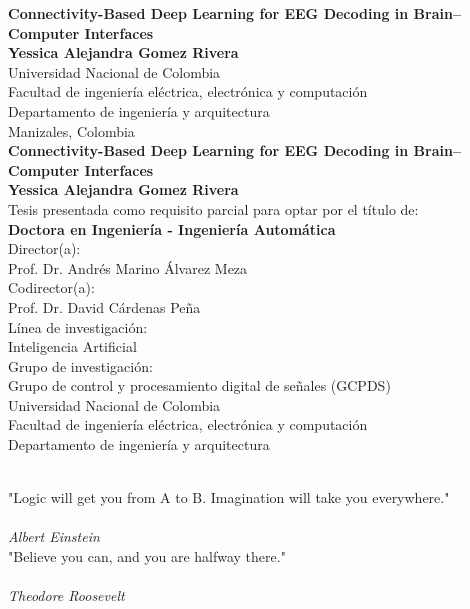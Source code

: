 \documentclass[10pt,english,openany,twoside,letterpaper]{book}
\newcommand{\studentname}{}
\newcommand{\academictitle}{}
\newcommand{\resgroupone}{}
\newcommand{\researchtopic}{}
\newcommand{\thesisname}{}
\newcommand{\director}{}
\newcommand{\codirector}{}
\newcommand{\issuedate}{}
\newcommand{\sede}{}
\newcommand{\department}{}
\newcommand{\faculty}{}
\renewcommand{\studentname}{Yessica Alejandra Gomez Rivera}
\renewcommand{\thesisname}{Connectivity-Based Deep Learning for EEG Decoding in Brain–Computer Interfaces}
\renewcommand{\issuedate}{\the\year}
\renewcommand{\director}{Prof. Dr. Andrés Marino Álvarez Meza}
\renewcommand{\codirector}{Prof. Dr. David Cárdenas Peña }
\renewcommand{\academictitle}{Doctora en Ingeniería - Ingeniería Automática}
\renewcommand{\resgroupone}{Grupo de control y procesamiento digital de señales (GCPDS) }
\renewcommand{\researchtopic}{Inteligencia Artificial}
\renewcommand{\sede}{Manizales}
\renewcommand{\department}{Departamento de ingeniería y arquitectura}
\renewcommand{\faculty}{Facultad de ingeniería eléctrica, electrónica y computación}
\begin{document}
{\newpage
\thispagestyle{empty}
\begin{center}
\begin{figure}
\centering
{}%
\end{figure}
\vspace{2.5cm}
\textbf{\Huge \thesisname} \\ 
\vspace{2.5cm}
\textbf{\Large \studentname} \\
\vspace{5.0cm}
\small Universidad Nacional de Colombia \\
\faculty \\
\department \\
\sede, Colombia\\
\issuedate
\newpage 
\thispagestyle{empty}
\vspace{2.5cm}
\textbf{\Huge \thesisname} \\
\vspace{2.5cm}
\textbf{\Large \studentname} \\
\vspace{2.5cm}
\small Tesis presentada como requisito parcial para optar por el título de: \\
{\bfseries \academictitle}\\
\vspace{2.5cm}
Director(a): \\
\director \\
Codirector(a): \\
\codirector \\
\vspace{2.5cm}
Línea de investigación: \\ 
\researchtopic\\
Grupo de investigación: \\
\resgroupone \\
\vspace{2.0cm} 
Universidad Nacional de Colombia \\
\faculty \\
\department \\
\issuedate
\end{center}

\newpage
\thispagestyle{empty}
\begin{flushright}
\begin{minipage}{12.5cm}
\noindent
\\[10em]
"Logic will get you from A to B. Imagination will take you everywhere."
\\[3em]
\\ \textit{Albert Einstein}
\\[10em]
"Believe you can, and you are halfway there."
\\[3em]
\\ \textit{Theodore Roosevelt}
\end{minipage}
\end{flushright} 

}
\end{document}
